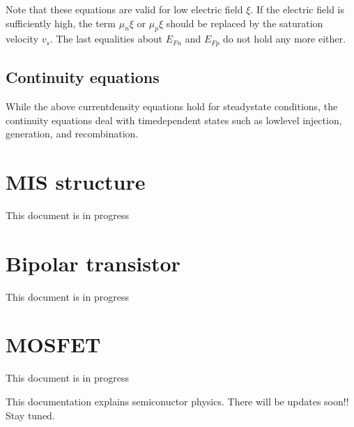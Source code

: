 \documentclass[a4paper,10pt,english]{sphinxmanual}
\begin{document}
\sphinxAtStartPar
Note that these equations are valid for low electric field \(\xi\).
If the electric field is sufficiently high, the term \(\mu_n\xi\) or \(\mu_p\xi\) should be replaced by the saturation velocity \(v_s\).
The last equalities about \(E_{Fn}\) and \(E_{Fp}\) do not hold any more either.


\subsection{Continuity equations}
\label{\detokenize{Basic_equation:continuity-equations}}
\sphinxAtStartPar
While the above current\sphinxhyphen{}density equations hold for steady\sphinxhyphen{}state conditions, the continuity equations deal with time\sphinxhyphen{}dependent states such as low\sphinxhyphen{}level injection, generation, and recombination.

\sphinxstepscope


\section{MIS structure}
\label{\detokenize{MIS_structure:mis-structure}}\label{\detokenize{MIS_structure::doc}}
\sphinxAtStartPar
This document is in progress

\sphinxstepscope


\section{Bipolar transistor}
\label{\detokenize{Bipolar_transistor:bipolar-transistor}}\label{\detokenize{Bipolar_transistor::doc}}
\sphinxAtStartPar
This document is in progress

\sphinxstepscope


\section{MOSFET}
\label{\detokenize{MOSFET:mosfet}}\label{\detokenize{MOSFET::doc}}
\sphinxAtStartPar
This document is in progress

\sphinxAtStartPar
This documentation explains semiconuctor physics.
There will be updates soon!!
Stay tuned.

\sphinxAtStartPar
{}



\renewcommand{\indexname}{Index}
\printindex
\end{document}
